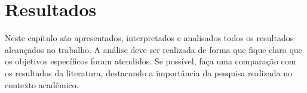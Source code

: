 \chapter{Resultados} \label{resultado}

Neste capítulo são apresentados, interpretados e analisados todos os resultados alcançados no trabalho. A análise deve ser realizada de forma que fique claro que os objetivos específicos foram atendidos. Se possível, faça uma comparação com os resultados da literatura, destacando a importância da pesquisa realizada no contexto acadêmico.


